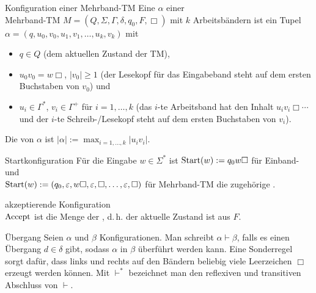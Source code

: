 \begin{Def}{Konfiguration einer Mehrband-TM}
    Eine  $\alpha$ einer\\
    Mehrband-TM
    $M = (Q, \Sigma, \Gamma, \delta, q_0, F, \Box)$ mit $k$ Arbeitsbändern ist ein Tupel\\
    $\alpha = (q, u_0, v_0, u_1, v_1, \dotsc, u_k, v_k)$ mit
    \begin{itemize}
        \item
        $q \in Q$ (dem aktuellen Zustand der TM),

        \item
        $u_0 v_0 = w \Box$, $|v_0| \ge 1$ (der Lesekopf für das Eingabeband steht auf dem ersten
        Buchstaben von $v_0$) und

        \item
        $u_i \in \Gamma^\ast$, $v_i \in \Gamma^+$ für $i = 1, \dotsc, k$
        (das $i$-te Arbeitsband hat den Inhalt $u_i v_i \Box \dotsb$ und der $i$-te
        Schreib-/Lesekopf steht auf dem ersten Buchstaben von $v_i$).
    \end{itemize}
    Die  von $\alpha$ ist $|\alpha| := \max_{i = 1, \dotsc, k} |u_i v_i|$.
\end{Def}

\linie
\pagebreak

\begin{Def}{Startkonfiguration}
    Für die Eingabe $w \in \Sigma^\ast$ ist $\text{Start}(w) := q_0 w \Box$ für Einband- und\\
    $\text{Start}(w) := (q_0, \varepsilon, w\Box, \varepsilon, \Box, \dotsc, \varepsilon, \Box)$
    für Mehrband-TM die zugehörige .
\end{Def}

\begin{Def}{akzeptierende Konfiguration}\\
    $\text{Accept}$ ist die Menge der ,
    d.\,h. der aktuelle Zustand ist aus $F$.
\end{Def}

\begin{Def}{Übergang}
    Seien $\alpha$ und $\beta$ Konfigurationen.
    Man schreibt $\alpha \vdash \beta$, falls es einen Übergang $d \in \delta$ gibt,
    sodass $\alpha$ in $\beta$ überführt werden kann.
    Eine Sonderregel sorgt dafür, dass links und rechts auf den Bändern beliebig viele
    Leerzeichen $\Box$ erzeugt werden können.
    Mit $\vdash^\ast$ bezeichnet man den reflexiven und transitiven Abschluss von $\vdash$.
\end{Def}

